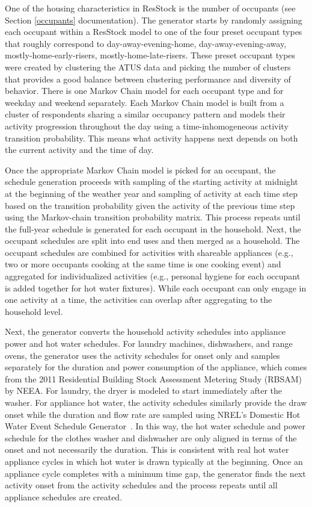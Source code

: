 One of the housing characteristics in ResStock is the number of occupants (see Section \ref{occupants} documentation). The generator starts by randomly assigning each occupant within a ResStock model to one of the four preset occupant types that roughly correspond to day-away-evening-home, day-away-evening-away, mostly-home-early-risers, mostly-home-late-risers. These preset occupant types were created by clustering the ATUS data and picking the number of clusters that provides a good balance between clustering performance and diversity of behavior. There is one Markov Chain model for each occupant type and for weekday and weekend separately. Each Markov Chain model is built from a cluster of respondents sharing a similar occupancy pattern and models their activity progression throughout the day using a time-inhomogeneous activity transition probability. This means what activity happens next depends on both the current activity and the time of day. 

Once the appropriate Markov Chain model is picked for an occupant, the schedule generation proceeds with sampling of the starting activity at midnight at the beginning of the weather year and sampling of activity at each time step based on the transition probability given the activity of the previous time step using the Markov-chain transition probability matrix. This process repeats until the full-year schedule is generated for each occupant in the household. Next, the occupant schedules are split into end uses and then merged as a household. The occupant schedules are combined for activities with shareable appliances (e.g., two or more occupants cooking at the same time is one cooking event) and aggregated for individualized activities (e.g., personal hygiene for each occupant is added together for hot water fixtures). While each occupant can only engage in one activity at a time, the activities can overlap after aggregating to the household level. 

Next, the generator converts the household activity schedules into appliance power and hot water schedules. For laundry machines, dishwashers, and range ovens, the generator uses the activity schedules for onset only and samples separately for the duration and power consumption of the appliance, which comes from the 2011 Residential Building Stock Assessment Metering Study (RBSAM) by NEEA. For laundry, the dryer is modeled to start immediately after the washer. For appliance hot water, the activity schedules similarly provide the draw onset while the duration and flow rate are sampled using NREL's Domestic Hot Water Event Schedule Generator~\citep{Hendron2010}. In this way, the hot water schedule and power schedule for the clothes washer and dishwasher are only aligned in terms of the onset and not necessarily the duration. This is consistent with real hot water appliance cycles in which hot water is drawn typically at the beginning. Once an appliance cycle completes with a minimum time gap, the generator finds the next activity onset from the activity schedules and the process repeats until all appliance schedules are created. 

